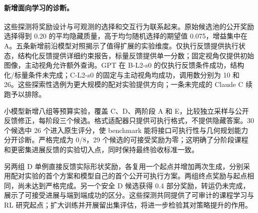 \paragraph{新增面向学习的诊断。}
这些探测将奖励设计与可观测的选择和交互行为联系起来。原始候选池的公开奖励选择得到 0.20 的平均隐藏质量，高于均匀随机选择的期望值 0.075，增益集中在 A。五条新增前沿模型对照揭示了值得扩展的实验维度。仅执行反馈提供执行状态，结构化反馈提供详细约束报告，标量反馈提供单一分数；固定视角仅提供初始图像，主动视角允许额外查询。GPT 在 B-L2-s0 的仅执行反馈条件成功，结构化/标量条件未完成；C-L2-s0 的固定与主动视角均成功，调用数分别为 10 和 26。这些探索性选例为更大规模的配对实验提供方向；一条未完成的 Claude C 续跑予以排除。

小模型新增八组等预算实验，覆盖 C、D、两阶段 A 和 E，比较独立采样与公开反馈修正，每阶段三个候选。格式适配器只提供可执行格式，不提供隐藏答案。30 个候选中 26 个进入原生评分，使 benchmark 能将接口可执行性与几何规划能力分开诊断。严格完成为 0/8，29 个候选的可接受奖励为零；这明确了分阶段课程和更密集进展反馈的实验切入点，同时保持最终验收标准一致。

另两组 D 单例直接反馈实际形状奖励，各复用一个起点并增加两次生成，分别采用配对实验的首个方案和模型自己的首个公开可执行方案。两组终点奖励与起点相同，尚未达到严格完成。另一个安全 D 候选获得 0.4 部分奖励，转运仍未完成，展示了可接受进展与端到端成功的区分。这些探测共同提供了可审计的课程学习与 RL 研究起点；扩大训练并开展留出集评估，将进一步检验其对策略提升的作用。
